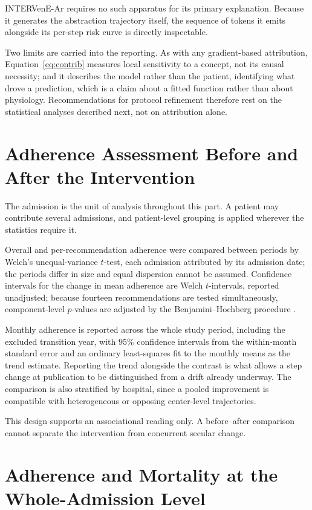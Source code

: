 INTERVenE-Ar requires no such apparatus for its primary explanation. Because it generates the abstraction trajectory itself, the sequence of tokens it emits alongside its per-step risk curve is directly inspectable.

Two limits are carried into the reporting. As with any gradient-based attribution, Equation~\eqref{eq:contrib} measures local sensitivity to a concept, not its causal necessity; and it describes the model rather than the patient, identifying what drove a prediction, which is a claim about a fitted function rather than about physiology. Recommendations for protocol refinement therefore rest on the statistical analyses described next, not on attribution alone.

\section{Adherence Assessment Before and After the Intervention}
\label{sec:evalm-adherence}

The admission is the unit of analysis throughout this part. A patient may contribute several admissions, and patient-level grouping is applied wherever the statistics require it.

Overall and per-recommendation adherence were compared between periods by Welch's unequal-variance $t$-test, each admission attributed by its admission date; the periods differ in size and equal dispersion cannot be assumed. Confidence intervals for the change in mean adherence are Welch $t$-intervals, reported unadjusted; because fourteen recommendations are tested simultaneously, component-level $p$-values are adjusted by the Benjamini--Hochberg procedure \citep{benjamini1995controlling}.

Monthly adherence is reported across the whole study period, including the excluded transition year, with $95\%$ confidence intervals from the within-month standard error and an ordinary least-squares fit to the monthly means as the trend estimate. Reporting the trend alongside the contrast is what allows a step change at publication to be distinguished from a drift already underway. The comparison is also stratified by hospital, since a pooled improvement is compatible with heterogeneous or opposing center-level trajectories.

This design supports an associational reading only. A before--after comparison cannot separate the intervention from concurrent secular change.

\section{Adherence and Mortality at the Whole-Admission Level}
\label{sec:evalm-mortality}

